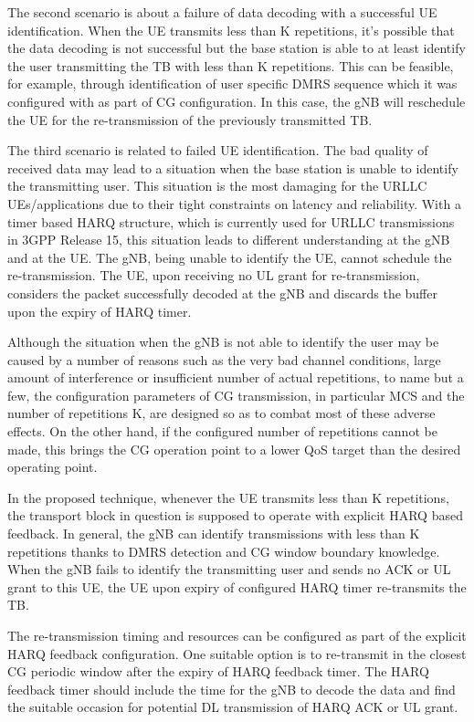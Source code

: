 \documentclass[conference]{IEEEtran}
\begin{document}
The second scenario is about a failure of data decoding with a successful UE identification. When the UE transmits less than K repetitions, it’s possible that the data decoding is not successful but the base station is able to at least identify the user transmitting the TB with less than K repetitions. This can be feasible, for example, through identification of user specific DMRS sequence which it was configured with as part of CG configuration. In this case, the gNB will reschedule the UE for the re-transmission of the previously transmitted TB. 

The third scenario is related to failed UE identification. The bad quality of received data may lead to a situation when the base station is unable to identify the transmitting user. This situation is the most damaging for the URLLC UEs/applications due to their tight constraints on latency and reliability. With a timer based HARQ structure, which is currently used for URLLC transmissions in 3GPP Release 15, this situation leads to different understanding at the gNB and at the UE. The gNB, being unable to identify the UE, cannot schedule the re-transmission. The UE, upon receiving no UL grant for re-transmission, considers the packet successfully decoded at the gNB and discards the buffer upon the expiry of HARQ timer.

Although the situation when the gNB is not able to identify the user may be caused by a number of reasons such as the very bad channel conditions, large amount of interference or insufficient number of actual repetitions, to name but a few, the configuration parameters of CG transmission, in particular MCS and the number of repetitions K, are designed so as to combat most of these adverse effects. On the other hand, if the configured number of repetitions cannot be made, this brings the CG operation point to a lower QoS target than the desired operating point.

In the proposed technique, whenever the UE transmits less than K repetitions, the transport block in question is supposed to operate with explicit HARQ based feedback. In general, the gNB can identify transmissions with less than K repetitions thanks to DMRS detection and CG window boundary knowledge. When the gNB fails to identify the transmitting user and sends no ACK or UL grant to this UE, the UE upon expiry of configured HARQ timer re-transmits the TB. 

The re-transmission timing and resources can be configured as part of the explicit HARQ feedback configuration. One suitable option is to re-transmit in the closest CG periodic window after the expiry of HARQ feedback timer. The HARQ feedback timer should include the time for the gNB to decode the data and find the suitable occasion for potential DL transmission of HARQ ACK or UL grant.
\end{document}
